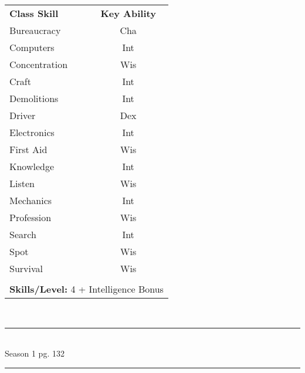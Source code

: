 \begin{table}[htb]
\raggedright
\begin{tabular}{l c}
\textbf{Class Skill} & \textbf{Key Ability}\\

Bureaucracy & Cha\\
Computers & Int\\
Concentration & Wis\\
Craft & Int\\
Demolitions & Int\\
Driver & Dex\\
Electronics & Int\\
First Aid & Wis\\
Knowledge & Int\\
Listen & Wis\\
Mechanics & Int\\
Profession & Wis\\
Search & Int\\
Spot & Wis\\
Survival & Wis\\


\multicolumn{2}{l}{\cellcolor{white}}\\
\multicolumn{2}{l}{\cellcolor{white}\textbf{Skills/Level:} 4 + Intelligence Bonus}\\
\end{tabular}
\end{table}

\setlength{\intextsep}{14.0pt plus 4.0pt minus 4.0pt}

\vspace*{3cm}

\vspace*{\fill}

\begin{center}
\textsc{\Large}\\[0.25cm]
\rule{\linewidth}{0.5mm}\\[0.6cm]
\fontsize{30}{30} \selectfont Season 1 pg. 132\\
\rule{\linewidth}{0.5mm}\\[0.6cm]
\vfill
\end{center}

\pagebreak



